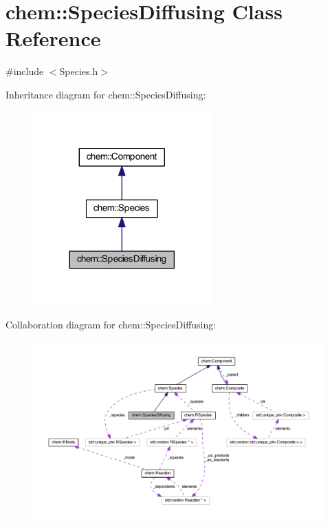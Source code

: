 \hypertarget{classchem_1_1SpeciesDiffusing}{\section{chem\-:\-:Species\-Diffusing Class Reference}
\label{classchem_1_1SpeciesDiffusing}
}


{\ttfamily \#include $<$Species.\-h$>$}



Inheritance diagram for chem\-:\-:Species\-Diffusing\-:\nopagebreak
\begin{figure}[H]
\begin{center}
\leavevmode
\includegraphics[width=194pt]{classchem_1_1SpeciesDiffusing__inherit__graph}
\end{center}
\end{figure}


Collaboration diagram for chem\-:\-:Species\-Diffusing\-:\nopagebreak
\begin{figure}[H]
\begin{center}
\leavevmode
\includegraphics[width=350pt]{classchem_1_1SpeciesDiffusing__coll__graph}
\end{center}
\end{figure}
